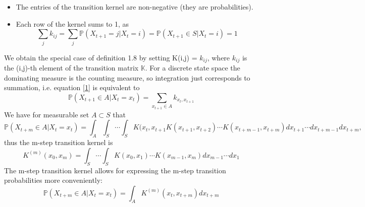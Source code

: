 \documentclass[a4paper,10pt]{article}
\begin{document}
    \begin{itemize}
     \item The entries of the transition kernel are non-negative (they are probabilities).
     \item Each row of the kernel sums to 1, as 
           \begin{equation}\label{1}
        \sum_{j} k_{ij} = \sum_{j} \mathbb{P}(X_{t+1} = j|X_{t} = i) = \mathbb{P}(X_{t+1} \in S|X_{t} = i) = 1
           \end{equation}

    \end{itemize}
We obtain the special case of definition 1.8 by setting K(i,j) = $k_{ij}$, where $k_{ij}$ is the (i,j)-th element 
of the transition matrix $\mathbb{K}$. For a discrete state space the dominating measure is the counting measure, so
integration just corresponds to summation, i.e. equation \ref{1} is equivalent to 
\begin{equation*}
 \mathbb{P}(X_{t+1} \in A|X_{t} = x_t) = \sum_{x_{t+1} \in A} k_{x_{t},x_{t+1}}
\end{equation*}
We have for measurable set $A \subset S$ that
    \begin{equation*}
 \mathbb{P} (X_{t+m} \in A|X_t = x_t) = \int_A \int_S \cdots \int_S K(x_t,x_{t+1}K(x_{t+1},x_{t+2})
\cdots K(x_{t+m-1},x_{t+m})dx_{t+1} \cdots dx_{t+m-1}dx_{t+m},
    \end{equation*}
thus the m-step transition kernel is
    \begin{equation*}
     K^{(m)}(x_0,x_m) = \int_S \cdots \int_S K(x_0,x_1)\cdots K(x_{m-1},x_{m})dx_{m-1}\cdots dx_1
    \end{equation*}
The m-step transition kernel allows for expressing the m-step transition probabilities more conveniently:
\begin{equation*}
   \mathbb{P} (X_{t+m} \in A|X_t = x_t) = \int_A K^{(m)}(x_t,x_{t+m})dx_{t+m}
\end{equation*}
\end{document}
